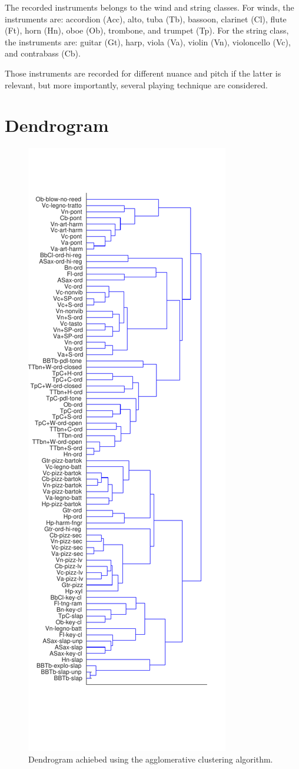 \documentclass{article}
\begin{document}
The recorded instruments belongs to the wind and string classes. For winds, the instruments are: accordion (Acc), alto, tuba (Tb), bassoon, clarinet (Cl), flute (Ft), horn (Hn), oboe (Ob), trombone, and trumpet (Tp). For the string class, the instruments are: guitar (Gt), harp, viola (Va), violin (Vn), violoncello (Vc), and contrabass (Cb).

Those instruments are recorded for different nuance and pitch if the latter is relevant, but more importantly, several playing technique are considered.

\section{Dendrogram}


\begin{figure}
\center
\includegraphics[width = \textwidth]{figures/dendrogram.pdf}
\caption{Dendrogram achiebed using the agglomerative clustering algorithm.}
\label{fig:dendrogram}
\end{figure}

%
\end{document}

